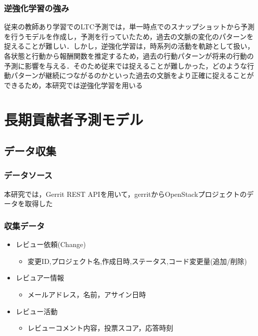\documentclass[submit,techrep,noauthor]{ipsj}
\begin{document}
\subsubsection{逆強化学習の強み}
従来の教師あり学習でのLTC予測では，単一時点でのスナップショットから予測を行うモデルを作成し，予測を行っていたため，過去の文脈の変化のパターンを捉えることが難しい．しかし，逆強化学習は，時系列の活動を軌跡として扱い，各状態と行動から報酬関数を推定するため，過去の行動パターンが将来の行動の予測に影響を与える．そのため従来では捉えることが難しかった，どのような行動パターンが継続につながるのかといった過去の文脈をより正確に捉えることができるため，本研究では逆強化学習を用いる


\section{長期貢献者予測モデル}
\label{sec:model}
\subsection{データ収集}
\subsubsection{データソース}
本研究では，Gerrit REST APIを用いて，gerritからOpenStackプロジェクトのデータを取得した
\subsubsection{収集データ}
\begin{itemize}
    \item レビュー依頼(Change)
    \begin{itemize}
        \item 変更ID,プロジェクト名,作成日時,ステータス,コード変更量(追加/削除)
    \end{itemize}
\end{itemize}
\begin{itemize}
    \item レビュアー情報
    \begin{itemize}
        \item メールアドレス，名前，アサイン日時
    \end{itemize}
\end{itemize}
\begin{itemize}
    \item レビュー活動
    \begin{itemize}
        \item  レビューコメント内容，投票スコア，応答時刻
    \end{itemize}
\end{itemize}
\end{document}
